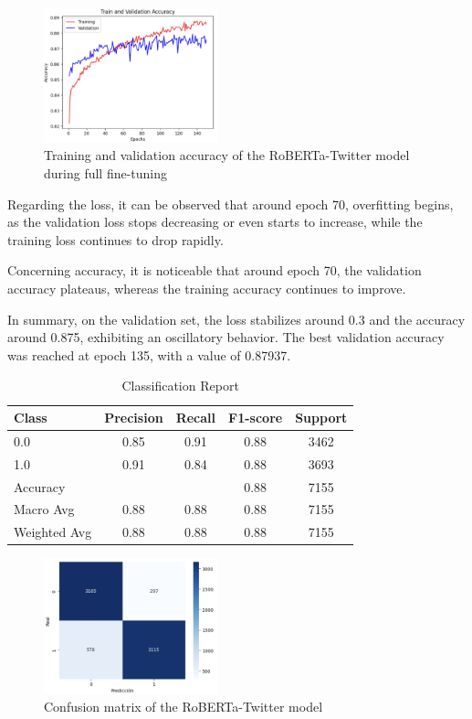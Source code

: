\begin{figure}[H]
    \centering
    \includegraphics[width=0.45\textwidth]{images/robertaAccuracyFigureY150Epoch.png}
    \caption{Training and validation accuracy of the RoBERTa-Twitter model during full fine-tuning}
    \label{fig:roberta_accuracy_finetune}
\end{figure}



Regarding the loss, it can be observed that around epoch 70, overfitting begins, as the validation loss stops decreasing or even starts to increase, while the training loss continues to drop rapidly. 

Concerning accuracy, it is noticeable that around epoch 70, the validation accuracy plateaus, whereas the training accuracy continues to improve. 

In summary, on the validation set, the loss stabilizes around 0.3 and the accuracy around 0.875, exhibiting an oscillatory behavior. The best validation accuracy was reached at epoch 135, with a value of 0.87937.

\begin{table}[H]
\centering
\caption{Classification Report}
\label{tab:classification_report_2}
\begin{tabular}{lcccc}
\toprule
Class        & Precision & Recall & F1-score & Support \\
\midrule
0.0          & 0.85      & 0.91   & 0.88     & 3462    \\
1.0          & 0.91      & 0.84   & 0.88     & 3693    \\
\midrule
Accuracy     &           &        & 0.88     & 7155    \\
Macro Avg    & 0.88      & 0.88   & 0.88     & 7155    \\
Weighted Avg & 0.88      & 0.88   & 0.88     & 7155    \\
\bottomrule
\end{tabular}
\end{table}

\begin{figure}[H]
    \centering
    \includegraphics[width=0.45\textwidth]{images/robertaConfusionMatrix.png} 
    \caption{Confusion matrix of the RoBERTa-Twitter model}
    \label{fig:roberta_confusion_matrix}
\end{figure}

